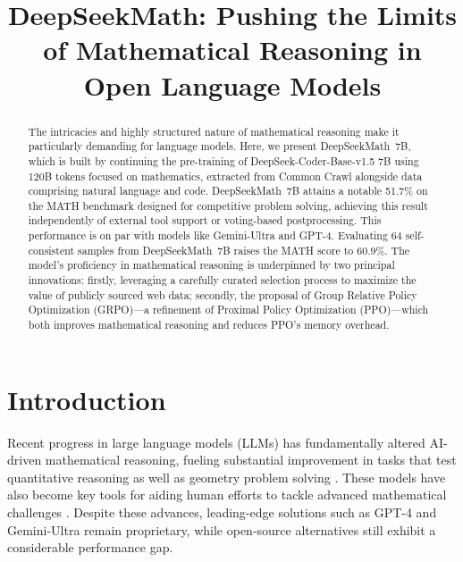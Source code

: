 \title{DeepSeekMath: Pushing the Limits of Mathematical Reasoning in Open Language Models}

\begin{abstract}
The intricacies and highly structured nature of mathematical reasoning make it particularly demanding for language models. Here, we present DeepSeekMath~7B, which is built by continuing the pre-training of DeepSeek-Coder-Base-v1.5 7B using 120B tokens focused on mathematics, extracted from Common Crawl alongside data comprising natural language and code. DeepSeekMath~7B attains a notable 51.7\% on the MATH benchmark designed for competitive problem solving, achieving this result independently of external tool support or voting-based postprocessing. This performance is on par with models like Gemini-Ultra and GPT-4. Evaluating 64 self-consistent samples from DeepSeekMath~7B raises the MATH score to 60.9\%. The model's proficiency in mathematical reasoning is underpinned by two principal innovations: firstly, leveraging a carefully curated selection process to maximize the value of publicly sourced web data; secondly, the proposal of Group Relative Policy Optimization (GRPO)—a refinement of Proximal Policy Optimization (PPO)—which both improves mathematical reasoning and reduces PPO's memory overhead.
\end{abstract}

\section{Introduction}

Recent progress in large language models (LLMs) has fundamentally altered AI-driven mathematical reasoning, fueling substantial improvement in tasks that test quantitative reasoning \citep{MATH} as well as geometry problem solving \citep{trinh2024solving}. These models have also become key tools for aiding human efforts to tackle advanced mathematical challenges \citep{tao}. Despite these advances, leading-edge solutions such as GPT-4 \citep{gpt4} and Gemini-Ultra \citep{gemini} remain proprietary, while open-source alternatives still exhibit a considerable performance gap.

